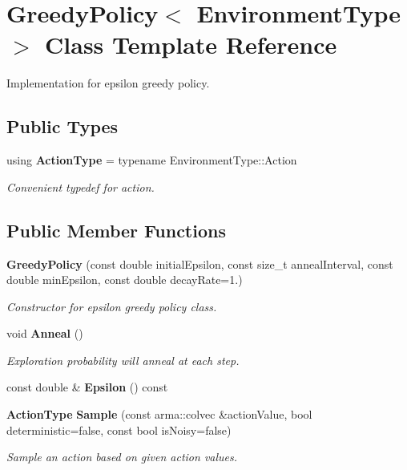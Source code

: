 \section{Greedy\+Policy$<$ Environment\+Type $>$ Class Template Reference}
\label{classmlpack_1_1rl_1_1GreedyPolicy}


Implementation for epsilon greedy policy.  


\subsection*{Public Types}
\begin{DoxyCompactItemize}
\item 
using \textbf{ Action\+Type} = typename Environment\+Type\+::\+Action
\begin{DoxyCompactList}\small\item\em Convenient typedef for action. \end{DoxyCompactList}\end{DoxyCompactItemize}
\subsection*{Public Member Functions}
\begin{DoxyCompactItemize}
\item 
\textbf{ Greedy\+Policy} (const double initial\+Epsilon, const size\+\_\+t anneal\+Interval, const double min\+Epsilon, const double decay\+Rate=1.)
\begin{DoxyCompactList}\small\item\em Constructor for epsilon greedy policy class. \end{DoxyCompactList}\item 
void \textbf{ Anneal} ()
\begin{DoxyCompactList}\small\item\em Exploration probability will anneal at each step. \end{DoxyCompactList}\item 
const double \& \textbf{ Epsilon} () const
\item 
\textbf{ Action\+Type} \textbf{ Sample} (const arma\+::colvec \&action\+Value, bool deterministic=false, const bool is\+Noisy=false)
\begin{DoxyCompactList}\small\item\em Sample an action based on given action values. \end{DoxyCompactList}\end{DoxyCompactItemize}


